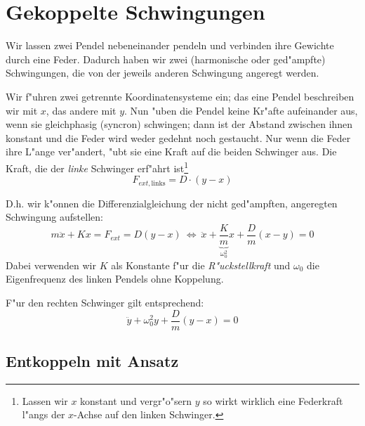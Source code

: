 






   





\section{Gekoppelte Schwingungen}
\label{kap_gekoppelte-schwingungen}

Wir lassen zwei Pendel nebeneinander pendeln und verbinden ihre
Gewichte durch eine Feder. Dadurch haben wir zwei (harmonische oder
ged"ampfte) Schwingungen, die von der jeweils anderen Schwingung
angeregt werden. 

Wir f"uhren zwei getrennte Koordinatensysteme ein; das eine Pendel
beschreiben wir mit $x$, das andere mit $y$. Nun "uben die Pendel keine
Kr"afte aufeinander aus, wenn sie gleichphasig (syncron) schwingen;
dann ist der Abstand zwischen ihnen konstant und die Feder wird weder
gedehnt noch gestaucht. Nur wenn die Feder ihre L"ange ver"andert, "ubt
sie eine Kraft auf die beiden Schwinger aus. Die Kraft, die der
\emph{linke} Schwinger erf"ahrt ist\footnote{Lassen wir $x$ konstant
  und vergr"o"sern $y$ so wirkt wirklich eine Federkraft l"angs der
  $x$-Achse auf den linken Schwinger.}
\begin{equation}
   \label{eq:138}
   F_{ext,\text{links}} = D \cdot(y-x)
\end{equation}

D.h. wir k"onnen die Differenzialgleichung der nicht ged"ampften,
angeregten Schwingung aufstellen:
\begin{equation}
   \label{eq:139}
   m \ddot x + Kx = F_{ext} = D(y-x) ~\Leftrightarrow ~ \ddot x +
   \underbrace{\frac{K}{m}}_{\omega_0^2}x + \frac{D}{m}(x-y) = 0
\end{equation}
Dabei verwenden wir $K$ als Konstante f"ur die \emph{R"uckstellkraft}
und $\omega_0$ die Eigenfrequenz des linken Pendels ohne Koppelung.

F"ur den rechten Schwinger gilt entsprechend:
\begin{equation}
   \label{eq:140}
   \ddot y + \omega_0^2 y + \frac{D}{m} (y-x) = 0
\end{equation}


\subsection{Entkoppeln mit Ansatz}
\label{kap_entkoppeln-mit-ansatz}


